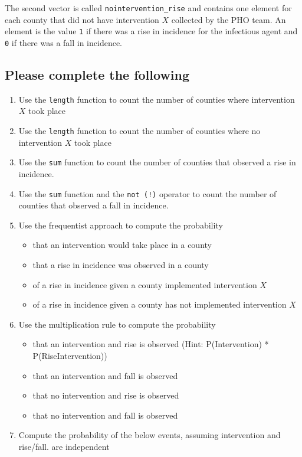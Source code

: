 The second vector is called \texttt{nointervention\_rise} and contains
one element for each county that did not have intervention \(X\)
collected by the PHO team. An element is the value \texttt{1} if there
was a rise in incidence for the infectious agent and \texttt{0} if there
was a fall in incidence.

\hypertarget{please-complete-the-following}{%
\subsection{Please complete the
following}\label{please-complete-the-following}}

\begin{enumerate}
\def\labelenumi{\arabic{enumi}.}
\tightlist
\item
  Use the \texttt{length} function to count the number of counties where
  intervention \(X\) took place
\item
  Use the \texttt{length} function to count the number of counties where
  no intervention \(X\) took place
\item
  Use the \texttt{sum} function to count the number of counties that
  observed a rise in incidence.
\item
  Use the \texttt{sum} function and the \texttt{not\ (!)} operator to
  count the number of counties that observed a fall in incidence.
\item
  Use the frequentist approach to compute the probability

  \begin{itemize}
  \tightlist
  \item
    that an intervention would take place in a county
  \item
    that a rise in incidence was observed in a county
  \item
    of a rise in incidence given a county implemented intervention \(X\)
  \item
    of a rise in incidence given a county has not implemented
    intervention \(X\)
  \end{itemize}
\item
  Use the multiplication rule to compute the probability

  \begin{itemize}
  \tightlist
  \item
    that an intervention and rise is observed (Hint: P(Intervention) *
    P(Rise\textbar Intervention))
  \item
    that an intervention and fall is observed
  \item
    that no intervention and rise is observed
  \item
    that no intervention and fall is observed
  \end{itemize}
\item
  Compute the probability of the below events, assuming intervention and
  rise/fall. are independent


\end{enumerate}

